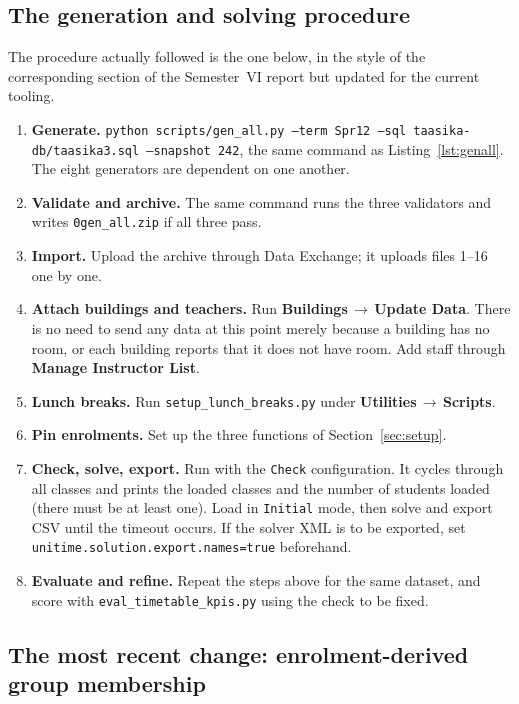 \subsection{The generation and solving procedure}

The procedure actually followed is the one below, in the style of the corresponding section of the
Semester~VI report but updated for the current tooling.

\begin{enumerate}
  \item \textbf{Generate.} \texttt{python scripts/gen\_all.py --term Spr12 --sql
    taasika-db/taasika3.sql --snapshot 242}, the same command as
    Listing~\ref{lst:genall}. The eight generators are dependent on one another.
  \item \textbf{Validate and archive.} The same command runs the three validators and writes
    \texttt{0gen\_all.zip} if all three pass.
  \item \textbf{Import.} Upload the archive through Data Exchange; it uploads files 1--16 one by
    one.
  \item \textbf{Attach buildings and teachers.} Run \textbf{Buildings\,$\rightarrow$\,Update
    Data}. There is no need to send any data at this point merely because a building has no room,
    or each building reports that it does not have room. Add staff through \textbf{Manage
    Instructor List}.
  \item \textbf{Lunch breaks.} Run \texttt{setup\_lunch\_breaks.py} under
    \textbf{Utilities\,$\rightarrow$\,Scripts}.
  \item \textbf{Pin enrolments.} Set up the three functions of Section~\ref{sec:setup}.
  \item \textbf{Check, solve, export.} Run with the \texttt{Check} configuration. It cycles through
    all classes and prints the loaded classes and the number of students loaded (there must be at
    least one). Load in \texttt{Initial} mode, then solve and export CSV until the timeout occurs.
    If the solver XML is to be exported, set \texttt{unitime.solution.export.names=true}
    beforehand.
  \item \textbf{Evaluate and refine.} Repeat the steps above for the same dataset, and score with
    \texttt{eval\_timetable\_kpis.py} using the check to be fixed.
\end{enumerate}

\subsection{The most recent change: enrolment-derived group membership}

